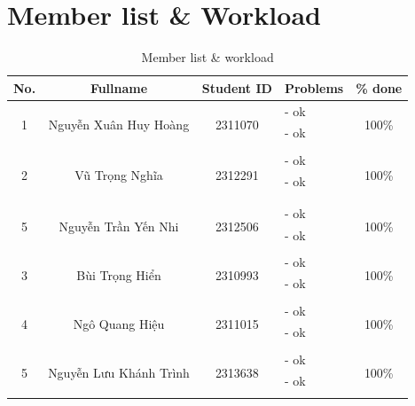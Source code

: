\section*{Member list \& Workload}
\begin{center}
\begin{table}[h]
\centering
\begin{tabular}{|c|c|c|p{6cm}|c|}
\hline
\textbf{No.} & \textbf{Fullname} & \textbf{Student ID} & \textbf{Problems} & \textbf{\% done}\\
\hline 
\multirow{3}{*}{1} & \multirow{3}{*}{Nguyễn Xuân Huy Hoàng} & \multirow{3}{*}{2311070} & 
- ok & \multirow{3}{*}{100\%}\\
 & &  & - ok  &\\
 & &  & &\\
\hline 
\multirow{4}{*}{2} & \multirow{4}{*}{Vũ Trọng Nghĩa} & \multirow{4}{*}{2312291} & 
- ok & \multirow{4}{*}{100\%}\\
 & &  & - ok  &\\
 & &  & &\\
 & &  & &\\
\hline
\multirow{3}{*}{5} & \multirow{3}{*}{Nguyễn Trần Yến Nhi} & \multirow{3}{*}{2312506} & 
- ok & \multirow{3}{*}{100\%}\\
 & &  & - ok  & \\
 & &  & & \\
\hline
\multirow{3}{*}{3} & \multirow{3}{*}{Bùi Trọng Hiển} & \multirow{3}{*}{2310993} & 
- ok  & \multirow{3}{*}{100\%}\\
 & &  & - ok  &\\
 & &  & &\\
\hline
\multirow{3}{*}{4} & \multirow{3}{*}{Ngô Quang Hiệu} & \multirow{3}{*}{2311015} & 
- ok & \multirow{3}{*}{100\%}\\
 & &  & - ok &\\
 & &  & & \\
\hline
\multirow{3}{*}{5} & \multirow{3}{*}{Nguyễn Lưu Khánh Trình} & \multirow{3}{*}{2313638} & 
- ok & \multirow{3}{*}{100\%}\\
 & &  & - ok  & \\
 & &  & & \\
\hline
\end{tabular}
\caption{\label{table1}Member list \& workload}
\end{table}
\end{center}
